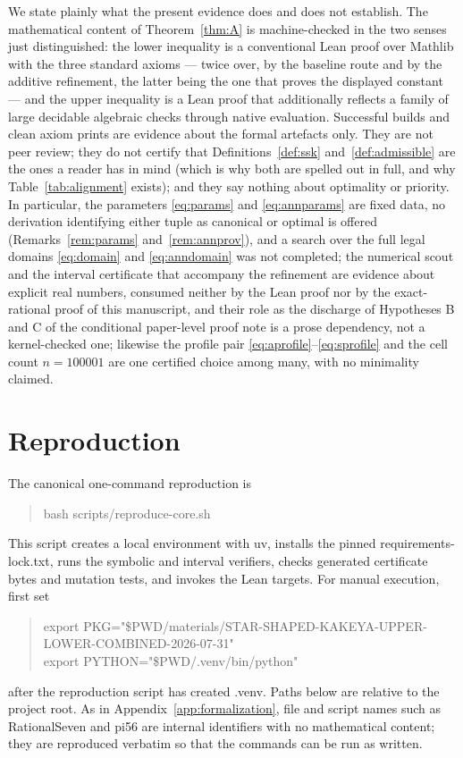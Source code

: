 \documentclass[11pt]{article}
\theoremstyle{plain}
\theoremstyle{definition}
\theoremstyle{remark}
\newcommand{\lean}[1]{%
  \begingroup\ttfamily\hyphenchar\font=-1\relax
  \def\_{\textunderscore\allowbreak}%
  #1\endgroup}
\begin{document}
We state plainly what the present evidence does and does not establish. The
mathematical content of Theorem~\ref{thm:A} is machine-checked in the two senses
just distinguished: the lower inequality is a conventional Lean proof over
Mathlib with the three standard axioms --- twice over, by the baseline route and
by the additive refinement, the latter being the one that proves the displayed
constant --- and the upper inequality is a Lean proof that additionally reflects
a family of large decidable algebraic checks through native evaluation. Successful builds and clean axiom prints are evidence about
the formal artefacts only. They are not peer review; they do not certify that
Definitions~\ref{def:ssk} and~\ref{def:admissible} are the ones a reader has in
mind (which is why both are spelled out in full, and why
Table~\ref{tab:alignment} exists); and they say nothing about optimality or
priority. In particular, the parameters \eqref{eq:params} and
\eqref{eq:annparams} are fixed data, no derivation identifying either tuple as
canonical or optimal is offered (Remarks~\ref{rem:params}
and~\ref{rem:annprov}), and a search over the full legal domains
\eqref{eq:domain} and \eqref{eq:anndomain} was not completed; the numerical
scout and the interval certificate that accompany the refinement are evidence
about explicit real numbers, consumed neither by the Lean proof nor by the
exact-rational proof of this manuscript, and their role as the discharge of
Hypotheses B and C of the conditional paper-level proof note is a prose
dependency, not a kernel-checked one; likewise the profile pair
\eqref{eq:aprofile}--\eqref{eq:sprofile} and the cell count $n=100001$ are one
certified choice among many, with no minimality claimed.

\clearpage
\section{Reproduction}\label{app:repro}

The canonical one-command reproduction is
\begin{quote}\small\ttfamily
bash scripts/reproduce-core.sh
\end{quote}
This script creates a local environment with \lean{uv}, installs the pinned
\lean{requirements-lock.txt}, runs the symbolic and interval verifiers, checks
generated certificate bytes and mutation tests, and invokes the Lean targets.
For manual execution, first set
\begin{quote}\small\ttfamily\raggedright
export PKG="\$PWD/materials/STAR-SHAPED-KAKEYA-UPPER-LOWER-COMBINED-2026-07-31"\\
export PYTHON="\$PWD/.venv/bin/python"
\end{quote}
after the reproduction script has created \lean{.venv}. Paths below are relative
to the project root. As in Appendix~\ref{app:formalization}, file and script
names such as \lean{RationalSeven} and \lean{pi56} are internal identifiers with
no mathematical content; they are reproduced verbatim so that the commands can
be run as written.
\end{document}
